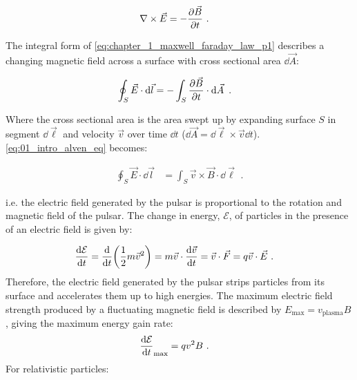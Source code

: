  \begin{equation}
    \begin{aligned}
    \nabla \times \vec{E} &= -\pdv{\vec{B}}{t}\text{ .}
    \end{aligned} \label{eq:chapter_1_maxwell_faraday_law_p1}
\end{equation}

\noindent The integral form of \autoref{eq:chapter_1_maxwell_faraday_law_p1} describes a changing magnetic field across a surface with cross sectional area  $\dd{\vec{A}}$:

\begin{equation}
    \begin{aligned}
    \oint_S \vec{E}\cdot \dd{\vec{l}}&=-\int_S \pdv{\vec{B}}{t} \cdot \dd{\vec{A}}\text{ .}
    \end{aligned} \label{eq:01_intro_alven_eq}
\end{equation}

\noindent Where the cross sectional area is the area swept up by expanding surface $S$ in segment $\dd{\vec{\ell}}$ and velocity $\vec{v}$ over time $\dd{t}$ ($\dd{\vec{A}}=\dd{\vec{\ell}}\times \vec{v}\dd{t}$). \autoref{eq:01_intro_alven_eq} becomes: 

\begin{equation}
    \begin{aligned}
    \oint_S \vec{E}\cdot \dd{\vec{l}}&=\int_S \vec{v}\times \vec{B}\cdot \dd{\vec{\ell}}\text{ .}
    \end{aligned} \label{eq:chapter_1_maxwell_faraday_law_p2}
\end{equation}

\noindent i.e. the electric field generated by the pulsar is proportional to the rotation and magnetic field of the pulsar. 
\newpar 
The change in energy, $\mathcal{E}$, of particles in the presence of an electric field is given by:

\begin{equation}
    \begin{aligned}
    \dv{\mathcal{E}}{t}&=\dv{}{t} \qty(\frac{1}{2} m\vec{v}^2) = m \vec{v} \cdot \dv{\vec{v}}{t} = \vec{v} \cdot \vec{F} = q\vec{v} \cdot \vec{E}\text{ .}
    \end{aligned} \label{eq:chapter_1_gain_energy_fields}
\end{equation}
\noindent Therefore, the electric field generated by the pulsar strips particles from its surface and accelerates them up to high energies. The maximum electric field strength produced by a fluctuating magnetic field is described by $E_\text{max}=v_\text{plasma}B$, giving the maximum energy gain rate:
\begin{equation}
    \begin{aligned}
    \dv{\mathcal{E}}{t}_\text{max}&=qv^2B\text{ .}
    \end{aligned}
\end{equation}
\noindent For relativistic particles:

